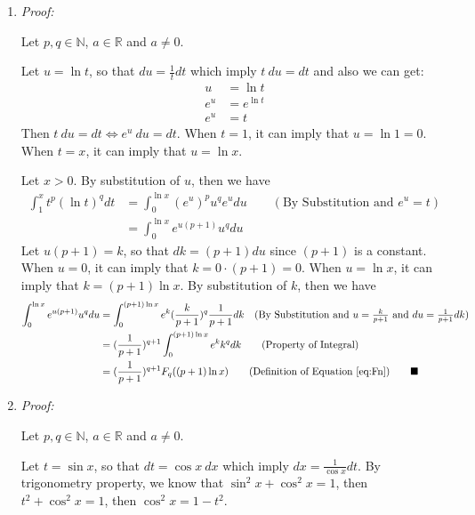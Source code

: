 \documentclass[12pt]{exam}
\newcommand{\R}{\mathbb{R}}
\newcommand{\N}{\mathbb{N}}
\begin{document}
\begin{enumerate}
\begin{enumerate}
        \newpage
    \item \emph{Proof:}
        
        Let $p, q\in\N$, $a\in\R$ and $a \neq 0$.
        
        Let $u=\ln t$, so that $du=\frac{1}{t}dt$ which imply $t\ du=dt$ and also we can get:
        \begin{align*}
            u&=\ln t\\
            e^u&=e^{\ln t}\\
            e^u&=t
        \end{align*}
        Then $t\ du=dt\iff e^u\ du=dt$. When $t=1$, it can imply that $u=\ln 1=0$. When $t=x$, it can imply that $u=\ln x$.
        
        Let $x>0$. By substitution of $u$, then we have
        \begin{align*}
            \int_1^x t^{p} \left( \ln t \right)^{q} dt&=\int_0^{\ln x} (e^u)^{p}u^{q}e^u du\qquad(\mbox{By Substitution and }e^u=t)\\
            &=\int_0^{\ln x} e^{u(p+1)}u^{q}du
        \end{align*}
        Let $u(p+1)=k$, so that $dk=(p+1)du$ since $(p+1)$ is a constant. When $u=0$, it can imply that $k=0\cdot(p+1)=0$. When $u=\ln x$, it can imply that $k=(p+1)\ln x$. By substitution of $k$, then we have
        \begin{align*}
            \int_0^{\ln x} e^{u(p+1)}u^{q}du&=\int_0^{(p+1)\ln x} e^k(\frac{k}{p+1})^{q}\frac{1}{p+1}dk\quad(\mbox{By Substitution and $u=\frac{k}{p+1}$ and $du=\frac{1}{p+1}dk$})\\
            &=(\frac{1}{p+1})^{q+1}\int_0^{(p+1)\ln x} e^kk^{q}dk\qquad(\mbox{Property of Integral})\\
            &=(\frac{1}{p+1})^{q+1}F_q((p+1)\ln x)\qquad(\mbox{Definition of Equation \eqref{eq:Fn}})\qquad\blacksquare
        \end{align*}
        
        \newpage
    \item \emph{Proof:}
    
        Let $p, q\in\N$, $a\in\R$ and $a \neq 0$.
        
        Let $t=\sin x$, so that $dt=\cos x\ dx$ which imply $dx=\frac{1}{\cos x}dt$. By trigonometry property, we know that $\sin^2 x+\cos^2 x=1$, then $t^2+\cos^2 x=1$, then $\cos^2 x=1-t^2$.
        

\end{enumerate}
\end{enumerate}
\end{document}
